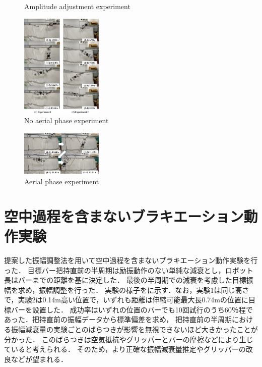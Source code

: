 \begin{small}
\begin{figure}[h]
  \caption{Amplitude adjustment experiment}
\end{figure}
\begin{figure}[h]
  \centering
  \includegraphics[width=0.35\textwidth]{fig/NoAerialForMaezuri.eps} %
  \vspace{-4mm}
  \caption{No aerial phase experiment}
\end{figure}
\begin{figure}[h]
  \centering
  \includegraphics[width=0.35\textwidth]{fig/AerialForMaezuri.eps} %
  \vspace{-4mm}
  \caption{Aerial phase experiment}
\end{figure}
\section{空中過程を含まないブラキエーション動作実験}
\vspace{-2mm}
提案した振幅調整法を用いて空中過程を含まないブラキエーション動作実験を行った．
目標バー把持直前の半周期は励振動作のない単純な減衰とし，ロボット長はバーまでの距離を基に決定した．
最後の半周期での減衰を考慮した目標振幅を求め，振幅調整を行った．
実験の様子をに示す．なお，実験1は同じ高さで，実験2は0.14m高い位置で，いずれも距離は伸縮可能最大長0.74mの位置に目標バーを設置した．
成功率はいずれの位置のバーでも10回試行のうち60％程であった．把持直前の振幅データから標準偏差を求め，
把持直前の半周期における振幅減衰量の実験ごとのばらつきが影響を無視できないほど大きかったことが分かった．
このばらつきは空気抵抗やグリッパーとバーの摩擦などにより生じていると考えられる．
そのため，より正確な振幅減衰量推定やグリッパーの改良などが望まれる．

\end{small}
